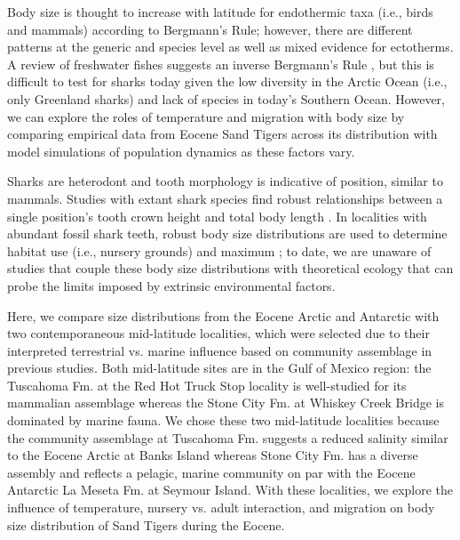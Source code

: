 \documentclass[]{rsos}%
\begin{document}
Body size is thought to increase with latitude for endothermic taxa (i.e., birds and mammals) according to Bergmann’s Rule; however, there are different patterns at the generic and species level as well as mixed evidence for ectotherms. A review of freshwater fishes suggests an inverse Bergmann’s Rule \cite{Belk2002}, but this is difficult to test for sharks today given the low diversity in the Arctic Ocean (i.e., only Greenland sharks) and lack of species in today’s Southern Ocean. 
However, we can explore the roles of temperature and migration with body size by comparing empirical data from Eocene Sand Tigers across its distribution with model simulations of population dynamics as these factors vary. 

Sharks are heterodont and tooth morphology is indicative of position, similar to mammals. Studies with extant shark species find robust relationships between a single position's tooth crown height and total body length \cite{Shimada2002, Shimada2004, Shimada2007}.  
In localities with abundant fossil shark teeth, robust body size distributions are used to determine habitat use (i.e., nursery grounds) and maximum \cite{Pimiento2010, Shimada2020, Villafana2020}; to date, we are unaware of studies that couple these body size distributions with theoretical ecology that can probe the limits imposed by extrinsic environmental factors. 

Here, we compare size distributions from the Eocene Arctic and Antarctic with two contemporaneous mid-latitude localities, which were selected due to their interpreted terrestrial vs. marine influence based on community assemblage in previous studies. 
Both mid-latitude sites are in the Gulf of Mexico region: the Tuscahoma Fm. at the Red Hot Truck Stop locality is well-studied for its mammalian assemblage whereas the Stone City Fm. at Whiskey Creek Bridge is dominated by marine fauna. 
We chose these two mid-latitude localities because the community assemblage at Tuscahoma Fm. suggests a reduced salinity similar to the Eocene Arctic at Banks Island whereas Stone City Fm. has a diverse assembly and reflects a pelagic, marine community on par with the Eocene Antarctic La Meseta Fm. at Seymour Island. 
With these localities, we explore the influence of temperature, nursery vs. adult interaction, and migration on body size distribution of Sand Tigers during the Eocene. 
\end{document}
